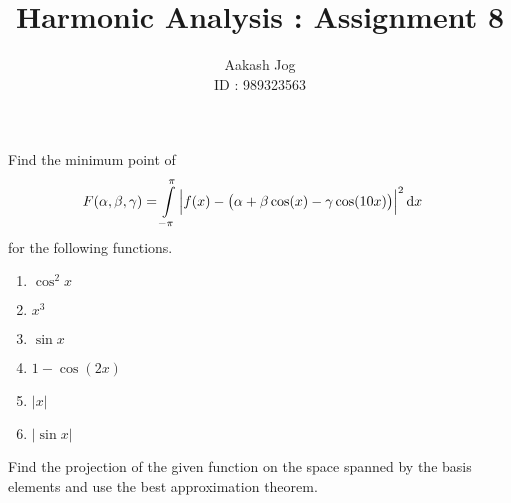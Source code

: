 \documentclass[fleqn, a4paper, 11pt, oneside]{amsart}
\title{Harmonic Analysis : Assignment 8}
\author
{
	Aakash Jog\\
	ID : 989323563
}
\date{\formatdate{29}{12}{2015}}
\theoremstyle{definition}
\theoremstyle{theorem}
\begin{document}

\maketitle

\begin{question}
	Find the minimum point of
	\begin{align*}
		F(\alpha,\beta,\gamma) &= \int\limits_{-\pi}^{\pi} \left| f(x) - \left( \alpha + \beta \cos(x) - \gamma \cos(10 x) \right) \right|^2 \dif x
	\end{align*}
	for the following functions.
	\begin{enumerate}
		\item $\cos^2 x$
		\item $x^3$
		\item $\sin x$
		\item $1 - \cos(2 x)$
		\item $|x|$
		\item $|\sin x|$
	\end{enumerate}
	Find the projection of the given function on the space spanned by the basis elements and use the best approximation theorem.
\end{question}
\end{document}
